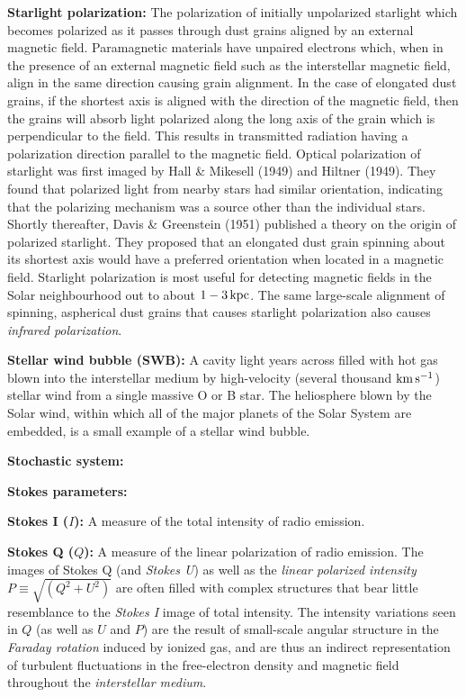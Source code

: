 \documentclass[a4paper,11pt]{article}
\begin{document}
{\noindent}\textbf{Starlight polarization:} The polarization of initially unpolarized starlight which becomes polarized as it passes through dust grains aligned by an external magnetic field. Paramagnetic materials have unpaired electrons which, when in the presence of an external magnetic field such as the interstellar magnetic field, align in the same direction causing grain alignment. In the case of elongated dust grains, if the shortest axis is aligned with the direction of the magnetic field, then the grains will absorb light polarized along the long axis of the grain which is perpendicular to the field. This results in transmitted radiation having a polarization direction parallel to the magnetic field. Optical polarization of starlight was first imaged by Hall \& Mikesell (1949) and Hiltner (1949). They found that polarized light from nearby stars had similar orientation, indicating that the polarizing mechanism was a source other than the individual stars. Shortly thereafter, Davis \& Greenstein (1951) published a theory on the origin of polarized starlight. They proposed that an elongated dust grain spinning about its shortest axis would have a preferred orientation when located in a magnetic field. Starlight polarization is most useful for detecting magnetic fields in the Solar neighbourhood out to about $1-3\,{\rm kpc}$. The same large-scale alignment of spinning, aspherical dust grains that causes starlight polarization also causes \textit{infrared polarization}.

{\noindent}\textbf{Stellar wind bubble (SWB):} A cavity light years across filled with hot gas blown into the interstellar medium by high-velocity (several thousand ${\rm km\,s^{-1}}$) stellar wind from a single massive O or B star. The heliosphere blown by the Solar wind, within which all of the major planets of the Solar System are embedded, is a small example of a stellar wind bubble.

{\noindent}\textbf{Stochastic system:}

{\noindent}\textbf{Stokes parameters:}

{\noindent}\textbf{Stokes I ($I$):} A measure of the total intensity of radio emission.

{\noindent}\textbf{Stokes Q ($Q$):} A measure of the linear polarization of radio emission. The images of Stokes Q (and \textit{Stokes U}) as well as the \textit{linear polarized intensity} $P\equiv\sqrt{(Q^2+U^2)}$ are often filled with complex structures that bear little resemblance to the \textit{Stokes I} image of total intensity. The intensity variations seen in $Q$ (as well as $U$ and $P$) are the result of small-scale angular structure in the \textit{Faraday rotation} induced by ionized gas, and are thus an indirect representation of turbulent fluctuations in the free-electron density and magnetic field throughout the \textit{interstellar medium}.
\end{document}
